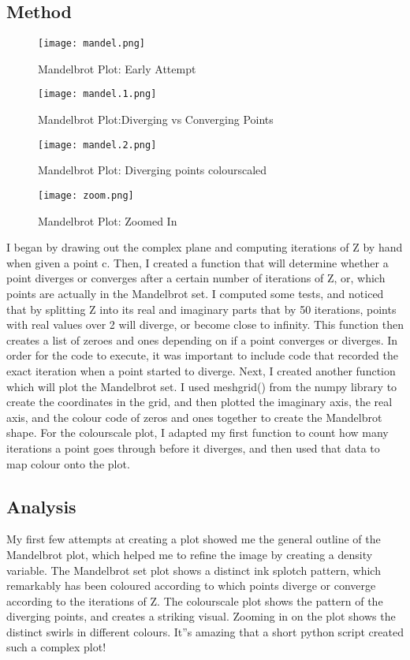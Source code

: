 \documentclass[12pt]{article}
\begin{document}
\subsection*{Method}
\begin{figure}[H]
    \centering
    \texttt{[image: mandel.png]}
    \caption{Mandelbrot Plot: Early Attempt }
\end{figure}
\begin{figure}[H]
    \centering
    \texttt{[image: mandel.1.png]}
    \caption{Mandelbrot Plot:Diverging vs Converging Points }
\end{figure}
\begin{figure}[H]
    \centering
    \texttt{[image: mandel.2.png]}
    \caption{Mandelbrot Plot: Diverging points colourscaled }
\end{figure}
\begin{figure}[H]
    \centering
    \texttt{[image: zoom.png]}
    \caption{Mandelbrot Plot: Zoomed In }
\end{figure}
I began by drawing out the complex plane and computing iterations of Z by hand when given a point c. Then, I created a function that will determine whether a point diverges or converges after a certain number of iterations of Z, or, which points are actually in the Mandelbrot set. I computed some tests, and noticed that by splitting Z into its real and imaginary parts that by 50 iterations, points with real values over 2 will diverge, or become close to infinity. This function then creates a list of zeroes and ones depending on if a point converges or diverges. In order for the code to execute, it was important to include code that recorded the exact iteration when a point started to diverge. Next, I created another function which will plot the Mandelbrot set. I used meshgrid() from the numpy library to create the coordinates in the grid, and then plotted the imaginary axis, the real axis, and the colour code of zeros and ones together to create the Mandelbrot shape. For the colourscale plot, I adapted my first function to count how many iterations a point goes through before it diverges, and then used that data to map colour onto the plot. 

\subsection*{Analysis}
My first few attempts at creating a plot showed me the general outline of the Mandelbrot plot, which helped me to refine the image by creating a density variable. The Mandelbrot set plot shows a distinct ink splotch pattern, which remarkably has been coloured according to which points diverge or converge according to the iterations of Z. The colourscale plot shows the pattern of the diverging points, and creates a striking visual. Zooming in on the plot shows the distinct swirls in different colours. It”s amazing that a short python script created such a complex plot! 
\end{document}
